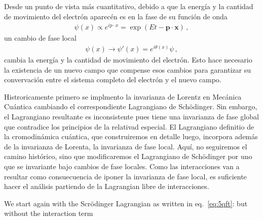 Desde un punto de vista más cuantitativo, debido a que la energía y la cantidad de movimiento del electrón aparecén es en la fase de su función de onda
\begin{align}
  \psi(x)\propto e^{i p\cdot x}=\exp(Et-\mathbf{p}\cdot \mathbf{x})\,,
\end{align}
un cambio de fase local
\begin{align}
 \psi(x)\to \psi'(x)=e^{{i\theta(x)}}\psi\,,
\end{align}
cambia la energía y la cantidad de movimiento del electrón. Esto hace necesario la existencia de un nuevo campo que compense esos cambios para garantizar su convervación entre el sistema completo del electrón y el nuevo campo.

Histroricamente primero se implmento la invarianza de Lorentz en Mecánica Cuántica cambiando el correspondiente Lagrangiano de Sch\"odinger. Sin embargo, el Lagrangiano resultante es inconsistente pues tiene una invarianza de fase global que contradice los principios de la relativad especial. El Lagrangiano definitio de la cromodinámica cuántica, que construiremos en detalle luego, incorpora además de la invarianza de Lorenta, la invarianza de fase local. Aquí, no seguiremos el camino histórico, sino que modificaremos el Lagrangiano de Sch\"odinger por uno que se invariante bajo cambios de fase locales. Como las interacciones van a resultar como consuecuencia de iponer la invarianza de fase local, es suficiente hacer el análisis partiendo de la Lagrangian libre de interacciones.

We start again with the Scrödinger Lagrangian as written in eq.~\eqref{eq:5qft}: but without the interaction term


